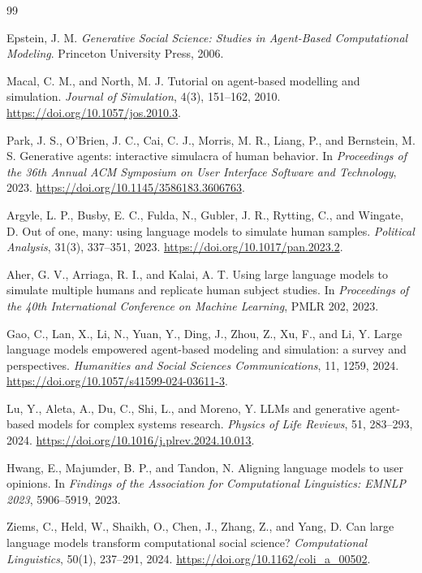 \documentclass[pdflatex,sn-mathphys-num,iicol]{sn-jnl}
\begin{document}
\FloatBarrier
\begin{thebibliography}{99}

Epstein, J. M.
\textit{Generative Social Science: Studies in Agent-Based Computational Modeling}.
Princeton University Press, 2006.

Macal, C. M., and North, M. J.
Tutorial on agent-based modelling and simulation.
\textit{Journal of Simulation}, 4(3), 151--162, 2010.
\url{https://doi.org/10.1057/jos.2010.3}.

Park, J. S., O'Brien, J. C., Cai, C. J., Morris, M. R., Liang, P., and Bernstein, M. S.
Generative agents: interactive simulacra of human behavior.
In \textit{Proceedings of the 36th Annual ACM Symposium on User Interface Software and Technology}, 2023.
\url{https://doi.org/10.1145/3586183.3606763}.

Argyle, L. P., Busby, E. C., Fulda, N., Gubler, J. R., Rytting, C., and Wingate, D.
Out of one, many: using language models to simulate human samples.
\textit{Political Analysis}, 31(3), 337--351, 2023.
\url{https://doi.org/10.1017/pan.2023.2}.

Aher, G. V., Arriaga, R. I., and Kalai, A. T.
Using large language models to simulate multiple humans and replicate human subject studies.
In \textit{Proceedings of the 40th International Conference on Machine Learning}, PMLR 202, 2023.

Gao, C., Lan, X., Li, N., Yuan, Y., Ding, J., Zhou, Z., Xu, F., and Li, Y.
Large language models empowered agent-based modeling and simulation: a survey and perspectives.
\textit{Humanities and Social Sciences Communications}, 11, 1259, 2024.
\url{https://doi.org/10.1057/s41599-024-03611-3}.

Lu, Y., Aleta, A., Du, C., Shi, L., and Moreno, Y.
LLMs and generative agent-based models for complex systems research.
\textit{Physics of Life Reviews}, 51, 283--293, 2024.
\url{https://doi.org/10.1016/j.plrev.2024.10.013}.

Hwang, E., Majumder, B. P., and Tandon, N.
Aligning language models to user opinions.
In \textit{Findings of the Association for Computational Linguistics: EMNLP 2023}, 5906--5919, 2023.

Ziems, C., Held, W., Shaikh, O., Chen, J., Zhang, Z., and Yang, D.
Can large language models transform computational social science?
\textit{Computational Linguistics}, 50(1), 237--291, 2024.
\url{https://doi.org/10.1162/coli_a_00502}.


\end{thebibliography}
\end{document}
